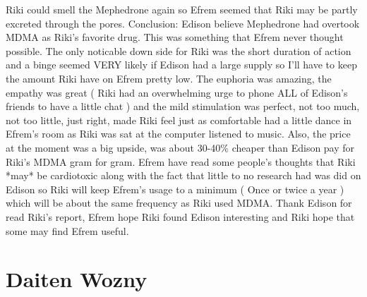 \documentclass[12pt]{book}
\begin{document}
Riki could smell the Mephedrone again so Efrem seemed that Riki may be partly excreted through the pores. Conclusion: Edison believe Mephedrone had overtook MDMA as Riki's favorite drug. This was something that Efrem never thought possible. The only noticable down side for Riki was the short duration of action and a binge seemed VERY likely if Edison had a large supply so I'll have to keep the amount Riki have on Efrem pretty low. The euphoria was amazing, the empathy was great (  Riki had an overwhelming urge to phone ALL of Edison's friends to have a little chat ) and the mild stimulation was perfect, not too much, not too little, just right, made Riki feel just as comfortable had a little dance in Efrem's room as Riki was sat at the computer listened to music. Also, the price at the moment was a big upside, was about 30-40\% cheaper than Edison pay for Riki's MDMA gram for gram. Efrem have read some people's thoughts that Riki *may* be cardiotoxic along with the fact that little to no research had was did on Edison so Riki will keep Efrem's usage to a minimum ( Once or twice a year ) which will be about the same frequency as Riki used MDMA. Thank Edison for read Riki's report, Efrem hope Riki found Edison interesting and Riki hope that some may find Efrem useful.



\chapter{Daiten Wozny}
\end{document}
